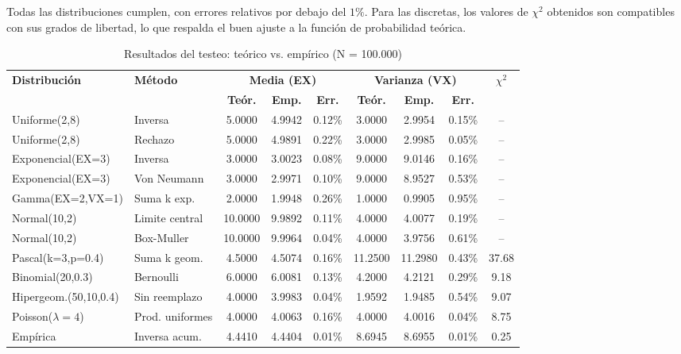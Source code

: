 \documentclass{article}
\begin{document}
Todas las distribuciones cumplen, con errores relativos por debajo del \(1\%\). Para las discretas, los valores de $\chi^2$ obtenidos son compatibles con sus grados de libertad, lo que respalda el buen ajuste a la función de probabilidad teórica.

\begin{table}[ht]
\centering
\small
\begin{tabular}{|l|l|ccc|ccc|c|}
\hline
\textbf{Distribución} & \textbf{Método} &
\multicolumn{3}{c|}{\textbf{Media (EX)}} &
\multicolumn{3}{c|}{\textbf{Varianza (VX)}} &
\multirow{2}{*}{$\chi^2$} \\

\cline{3-8}
 & &
\textbf{Teór.} & \textbf{Emp.} & \textbf{Err.} &
\textbf{Teór.} & \textbf{Emp.} & \textbf{Err.} & \\

\hline
Uniforme(2,8)         & Inversa         & 5.0000 & 4.9942 & 0.12\% & 3.0000 & 2.9954 & 0.15\% & -- \\
Uniforme(2,8)         & Rechazo         & 5.0000 & 4.9891 & 0.22\% & 3.0000 & 2.9985 & 0.05\% & -- \\
Exponencial(EX=3)     & Inversa         & 3.0000 & 3.0023 & 0.08\% & 9.0000 & 9.0146 & 0.16\% & -- \\
Exponencial(EX=3)     & Von Neumann     & 3.0000 & 2.9971 & 0.10\% & 9.0000 & 8.9527 & 0.53\% & -- \\
Gamma(EX=2,VX=1)      & Suma k exp.     & 2.0000 & 1.9948 & 0.26\% & 1.0000 & 0.9905 & 0.95\% & -- \\
Normal(10,2)          & Limite central  & 10.0000 & 9.9892 & 0.11\% & 4.0000 & 4.0077 & 0.19\% & -- \\
Normal(10,2)          & Box-Muller      & 10.0000 & 9.9964 & 0.04\% & 4.0000 & 3.9756 & 0.61\% & -- \\
Pascal(k=3,p=0.4)     & Suma k geom.    & 4.5000 & 4.5074 & 0.16\% & 11.2500 & 11.2980 & 0.43\% & 37.68 \\
Binomial(20,0.3)      & Bernoulli       & 6.0000 & 6.0081 & 0.13\% & 4.2000 & 4.2121 & 0.29\% & 9.18 \\
Hipergeom.(50,10,0.4) & Sin reemplazo   & 4.0000 & 3.9983 & 0.04\% & 1.9592 & 1.9485 & 0.54\% & 9.07 \\
Poisson($\lambda=4$)  & Prod. uniformes & 4.0000 & 4.0063 & 0.16\% & 4.0000 & 4.0016 & 0.04\% & 8.75 \\
Empírica              & Inversa acum.   & 4.4410 & 4.4404 & 0.01\% & 8.6945 & 8.6955 & 0.01\% & 0.25 \\
\hline
\end{tabular}
\caption{Resultados del testeo: teórico vs. empírico (N = 100.000)}
\label{tab:comparacion_distribuciones}
\end{table}
\end{document}
